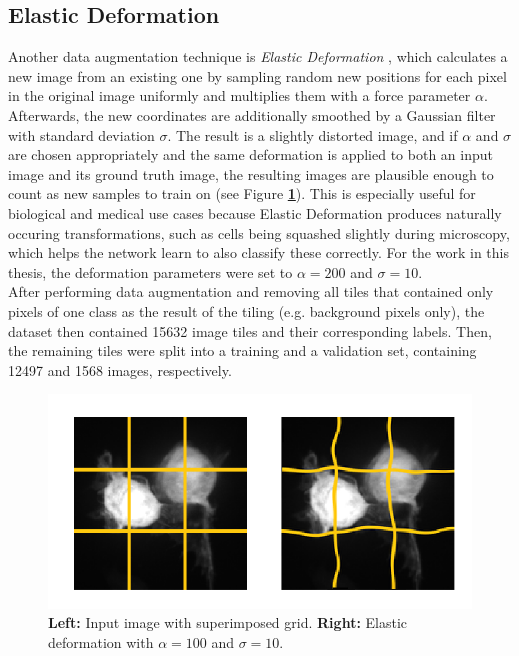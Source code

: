 		\subsection{Elastic Deformation}
Another data augmentation technique is \textit{Elastic Deformation} \cite{elastic}, which calculates a new image from an existing one by sampling random new positions for each pixel in the original image uniformly and multiplies them with a force parameter $\alpha$. Afterwards, the new coordinates are additionally smoothed by a Gaussian filter with standard deviation $\sigma$. The result is a slightly distorted image, and if $\alpha$ and $\sigma$ are chosen appropriately and the same deformation is applied to both an input image and its ground truth image, the resulting images are plausible enough to count as new samples to train on (see Figure \textbf{\ref{fig:elastic}}). This is especially useful for biological and medical use cases because Elastic Deformation produces naturally occuring transformations, such as cells being squashed slightly during microscopy, which helps the network learn to also classify these correctly. For the work in this thesis, the deformation parameters were set to $\alpha = 200$ and $\sigma = 10$.\\

\noindent After performing data augmentation and removing all tiles that contained only pixels of one class as the result of the tiling (e.g. background pixels only), the dataset then contained 15632 image tiles and their corresponding labels. Then, the remaining tiles were split into a training and a validation set, containing 12497 and 1568 images, respectively.


\begin {figure}[!ht]
	\begin{center}
		\includegraphics[scale=0.80]{img/fig_elastic.png}
	\end{center}
	\caption[Elastic deformation.]{\textbf{Left:} Input image with superimposed grid. \textbf{Right:} Elastic deformation with $\alpha = 100$ and $\sigma = 10$.}
	\label{fig:elastic}
\end {figure}


